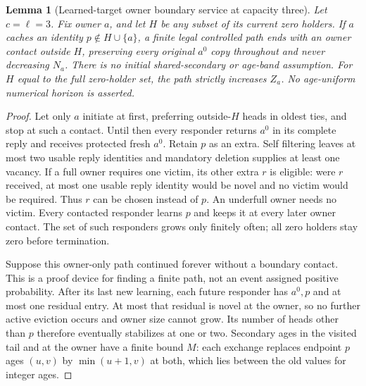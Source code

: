 \documentclass[11pt]{article}
\newtheorem{lemma}[theorem]{Lemma}
\begin{document}
\begin{lemma}[Learned-target owner boundary service at capacity three]
\label{lem:c3learnedcallback}
Let $c=\ell=3$. Fix owner $a$, and let $H$ be any subset
of its current zero holders. If $a$ caches an identity
$p\notin H\cup\{a\}$, a finite legal controlled path ends
with an owner contact outside $H$, preserving every original
$a^0$ copy throughout and never decreasing $N_a$.
There is no initial shared-secondary or age-band assumption.
For $H$ equal to the full zero-holder set, the path strictly
increases $Z_a$. No age-uniform numerical horizon is asserted.
\end{lemma}
\begin{proof}
Let only $a$ initiate at first, preferring outside-$H$ heads
in oldest ties, and stop at such a contact. Until then every
responder returns $a^0$ in its complete reply and receives
protected fresh $a^0$. Retain $p$ as an extra. Self filtering
leaves at most two usable reply identities and mandatory
deletion supplies at least one vacancy. If a full owner
requires one victim, its other extra $r$ is eligible: were
$r$ received, at most one usable reply identity would be
novel and no victim would be required. Thus $r$ can be
chosen instead of $p$. An underfull owner needs no victim.
Every contacted responder learns $p$ and keeps it at every
later owner contact. The set of such responders grows only
finitely often; all zero holders stay zero before termination.

Suppose this owner-only path continued forever without a
boundary contact. This is a proof device for finding a finite
path, not an event assigned positive probability. After its
last new learning, each future responder has $a^0,p$ and
at most one residual entry. At most that residual is novel
at the owner, so no further active eviction occurs and owner
size cannot grow. Its number of heads other than $p$ therefore
eventually stabilizes at one or two. Secondary ages in the
visited tail and at the owner have a finite bound $M$:
each exchange replaces endpoint $p$ ages $(u,v)$ by
$\min(u+1,v)$ at both, which lies between the old values
for integer ages.


\end{proof}
\end{document}
